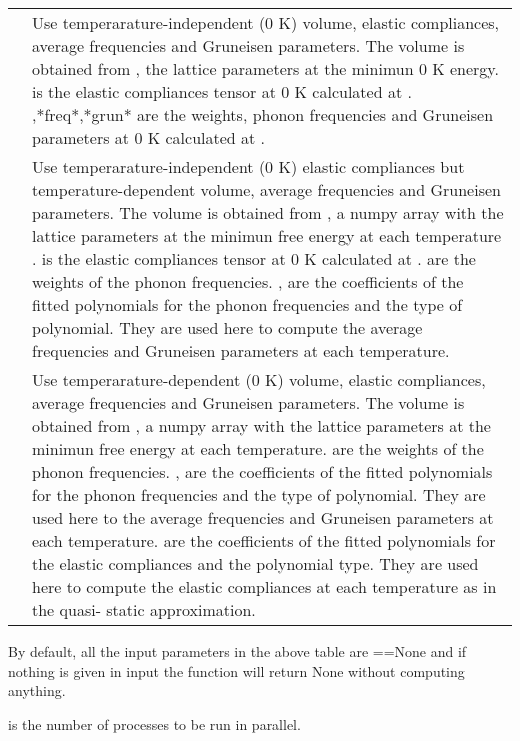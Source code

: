 \documentclass[letterpaper,10pt,english]{sphinxmanual}
\begin{document}
\begin{fulllineitems}
\noindent\begin{tabulary}{\linewidth}{|L|L|}
\hline
{}\relax &\relax \\
\hline
{}
&
Use temperarature-independent (0 K) volume, elastic compliances,
average frequencies and Gruneisen parameters. The volume is obtained
from , the lattice parameters at the minimun 0 K energy.  is
the elastic compliances tensor at 0 K calculated at . 
,*freq*,*grun* are the weights, phonon frequencies and Gruneisen
parameters at 0 K calculated at .
\\
\hline
{}
&
Use temperarature-independent (0 K) elastic compliances but
temperature-dependent volume, average frequencies and Gruneisen
parameters. The volume is obtained from , a numpy array with
the lattice parameters at the minimun free energy at each temperature
.  is the elastic compliances tensor at 0 K calculated at .
 are the weights of the phonon frequencies.  ,
 are the coefficients of the fitted polynomials for the
phonon frequencies and the type of polynomial. They are used here to
compute the average frequencies and Gruneisen parameters at each
temperature.
\\
\hline
{}
&
Use temperarature-dependent (0 K) volume, elastic compliances,
average frequencies and Gruneisen parameters. The volume is obtained
from , a numpy array with the lattice parameters at the minimun
free energy at each temperature.  are the weights of the
phonon frequencies. ,
 are the coefficients of the fitted polynomials for the
phonon frequencies and the type of polynomial. They are used here to
the average frequencies and Gruneisen parameters at each temperature.
 are the coefficients of the fitted polynomials for the
elastic compliances and the polynomial type. They are used here to
compute the elastic compliances at each temperature as in the quasi-
static approximation.
\\
\hline\end{tabulary}


By default, all the input parameters in the above table are ==None and if nothing
is given in input the function will return None without computing anything.

 is the number of processes to be run in parallel.

\end{fulllineitems}
\end{document}
